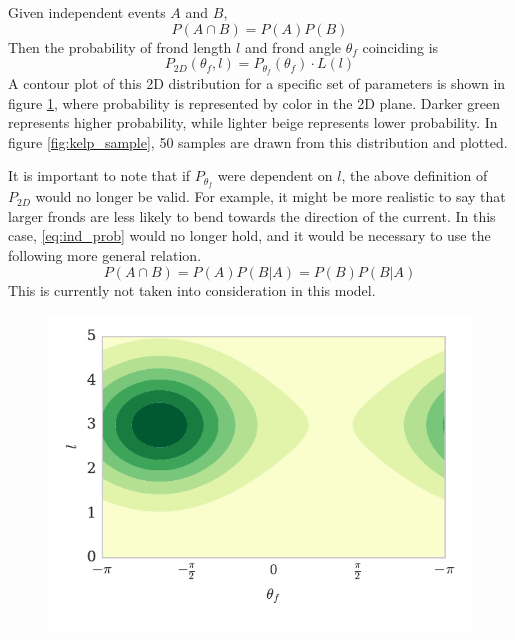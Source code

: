 Given independent events $A$ and $B$,
\begin{equation}
	\label{eq:ind_prob}
	P(A \cap B) = P(A)P(B)
\end{equation}
Then the probability of frond length $l$ and frond angle $\theta_f$ coinciding is 
\begin{equation}
	P_{2D}(\theta_f,l) = P_{\theta_f}(\theta_f) \cdot L(l)
\end{equation}
A contour plot of this 2D distribution for a specific set of parameters is shown in figure \ref{fig:dist_2d}, where probability is represented by color in the 2D plane.
Darker green represents higher probability, while lighter beige represents lower probability.
In figure \ref{fig:kelp_sample}, 50 samples are drawn from this distribution and plotted.

It is important to note that if $P_{\theta_f}$ were dependent on $l$, the above definition of $P_{2D}$ would no longer be valid.
For example, it might be more realistic to say that larger fronds are less likely to bend towards the direction of the current.
In this case, \eqref{eq:ind_prob} would no longer hold, and it would be necessary to use the following more general relation.
\begin{equation}
	P(A \cap B) = P(A)P(B|A) = P(B)P(B|A)
\end{equation}
This is currently not taken into consideration in this model.

\begin{figure}[H]
	\centering
	\includegraphics[width=\linewidth]{prob_2d}
	\vspace{-3em}
	\label{fig:dist_2d}
\end{figure}


